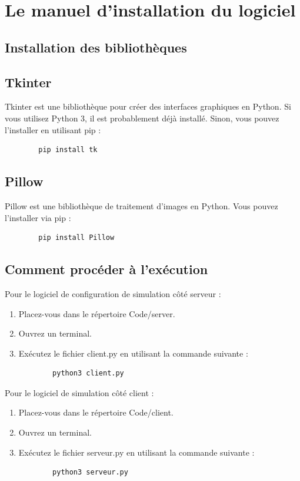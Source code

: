 \documentclass[12pt,a4paper]{scrartcl}
\theoremstyle{plain}
\theoremstyle{definition}
\theoremstyle{remark}
\begin{document}
	\section{Le manuel d’installation du logiciel}
	 \subsection{Installation des bibliothèques}
	 
	 \subsection{Tkinter}
	 Tkinter est une bibliothèque pour créer des interfaces graphiques en Python. Si vous utilisez Python 3, il est probablement déjà installé. Sinon, vous pouvez l'installer en utilisant pip :
	 \begin{verbatim}
	 	pip install tk
	 \end{verbatim}
	 
	 \subsection{Pillow}
	 Pillow est une bibliothèque de traitement d'images en Python. Vous pouvez l'installer via pip :
	 \begin{verbatim}
	 	pip install Pillow
	 \end{verbatim}
	 


\subsection{Comment procéder à l'exécution}

Pour le logiciel de configuration de simulation côté serveur :

\begin{enumerate}
	\item Placez-vous dans le répertoire Code/server.
	\item Ouvrez un terminal.
	\item Exécutez le fichier client.py en utilisant la commande suivante :
	\begin{verbatim}
		python3 client.py
	\end{verbatim}
\end{enumerate}

Pour le logiciel de simulation côté client :

\begin{enumerate}
	\item Placez-vous dans le répertoire Code/client.
	\item Ouvrez un terminal.
	\item Exécutez le fichier serveur.py en utilisant la commande suivante :
	\begin{verbatim}
		python3 serveur.py
	\end{verbatim}
\end{enumerate}
\end{document}
